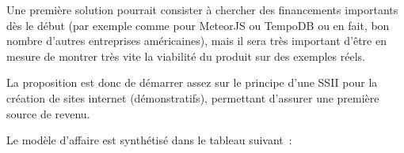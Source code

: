 \documentclass[a4paper,10pt]{scrreprt}
\begin{document}
    Une première solution pourrait consister à chercher des financements importants dès le début (par exemple comme pour MeteorJS ou TempoDB ou en fait, bon nombre d'autres entreprises américaines), mais il sera très important d'être en mesure de montrer très vite la viabilité du produit sur des exemples réels.
    
    La proposition est donc de démarrer assez sur le principe d'une SSII pour la création de sites internet (démonstratifs), permettant d'assurer une première source de revenu.
    

    \medskip
    Le modèle d'affaire est synthétisé dans le tableau suivant~:
    
\end{document}
